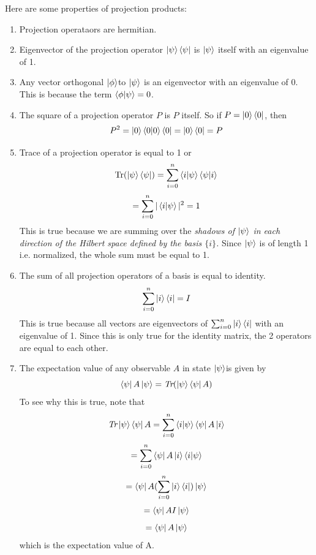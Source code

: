 \documentclass{article}
\begin{document}
Here are some properties of projection products:
\begin{enumerate}
  \item Projection operataors are hermitian.
  \item Eigenvector of the projection operator \(\ket{\psi}\bra{\psi}\)
  is \(\ket{\psi}\) itself with an eigenvalue of 1.
  \item Any vector orthogonal \(\ket{\phi}\)to \(\ket{\psi}\) is an eigenvector with an eigenvalue of 0. This is because the term \(\bra{\phi}\ket{\psi} = 0\).
  \item The square of a projection operator \(P\) is \(P\)
  itself. So if \(P = \ket{0}\bra{0}\), then
  \[P^2 = \ket{0}\bra{0}\ket{0}\bra{0} = \ket{0}\bra{0} = P\]
  \item Trace of a projection operator is equal to 1 or
  \[\text{Tr}(\ket{\psi}\bra{\psi}) = \sum_{i = 0}^n \bra{i}\ket{\psi}\bra{\psi}\ket{i} \]
  \[= \sum_{i = 0}^n |\bra{i}\ket{\psi}|^2 = 1\]
  This is true because we are summing over the \textit{shadows of
  \(\ket{\psi}\) in each direction of the Hilbert space defined by
  the basis \(\{i\}\).} Since \(\ket{\psi}\) is of length 1 i.e.
  normalized, the whole sum must be equal to 1.
  \item The sum of all projection operators of a basis is equal to
  identity.
  \[\sum_{i=0}^n \ket{i}\bra{i} = I \]
  This is true because all vectors are eigenvectors of \(\sum_{i=0}^n \ket{i}\bra{i}\) with an eigenvalue of 1. Since this is only true for the identity matrix, the 2 operators are equal to each other.
  \item The expectation value of any observable \(A\) in
  state \(\ket{\psi}\)is given by
  \[\bra{\psi}A\ket{\psi} = \textit{Tr} (\ket{\psi}\bra{\psi}A)\]
  To see why this is true, note that
  \[\textit{Tr} \ket{\psi}\bra{\psi}A = \sum_{i = 0}^n \bra{i}\ket{\psi}\bra{\psi}A\ket{i}\]
  \[=  \sum_{i = 0}^n \bra{\psi}A\ket{i}\bra{i}\ket{\psi}\]
  \[= \bra{\psi}A(\sum_{i = 0}^n \ket{i}\bra{i})\ket{\psi}\]
  \[= \bra{\psi}A I\ket{\psi}\]
  \[= \bra{\psi}A\ket{\psi}\]
  which is the expectation value of A.

\end{enumerate}
\end{document}
